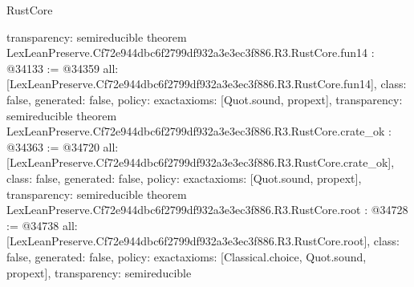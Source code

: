 \begin{lexlean}{RustCore}
\begin{coremodule}
{  transparency: semireducible
}
theorem LexLeanPreserve.Cf72e944dbc6f2799df932a3e3ec3f886.R3.RustCore.fun14 : @34133 := @34359 {
  all: [LexLeanPreserve.Cf72e944dbc6f2799df932a3e3ec3f886.R3.RustCore.fun14],
  class: false,
  generated: false,
  policy: exact{axioms: [Quot.sound, propext]},
  transparency: semireducible
}
theorem LexLeanPreserve.Cf72e944dbc6f2799df932a3e3ec3f886.R3.RustCore.crate_ok : @34363 := @34720 {
  all: [LexLeanPreserve.Cf72e944dbc6f2799df932a3e3ec3f886.R3.RustCore.crate_ok],
  class: false,
  generated: false,
  policy: exact{axioms: [Quot.sound, propext]},
  transparency: semireducible
}
theorem LexLeanPreserve.Cf72e944dbc6f2799df932a3e3ec3f886.R3.RustCore.root : @34728 := @34738 {
  all: [LexLeanPreserve.Cf72e944dbc6f2799df932a3e3ec3f886.R3.RustCore.root],
  class: false,
  generated: false,
  policy: exact{axioms: [Classical.choice, Quot.sound, propext]},
  transparency: semireducible
}


\end{coremodule}
\end{lexlean}

